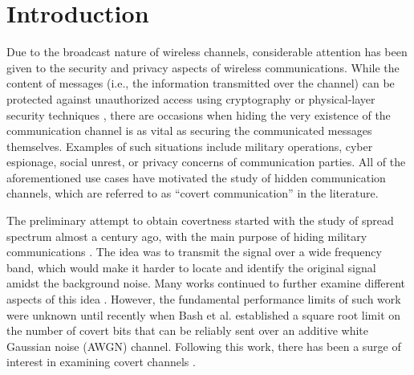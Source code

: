 \section{Introduction}
\label{s:intro}
Due to the broadcast nature of wireless channels, considerable attention has been given to the security and privacy aspects of wireless communications. While the content of messages (i.e., the information transmitted over the channel) can be protected against unauthorized access using cryptography or physical-layer security techniques \cite{zhou2013physical}, there are occasions when hiding the very existence of the communication channel is as vital as securing the communicated messages themselves. Examples of such situations include military operations, cyber espionage, social unrest, or privacy concerns of communication parties. All of the aforementioned use cases have motivated the study of hidden communication channels, which are referred to as ``covert communication'' \cite{lampson1973note, bloch2016covert} in the literature.

The preliminary attempt to obtain covertness started with the study of spread spectrum almost a century ago, with the main purpose of hiding military communications \cite{scholtz1982origins}. The idea was to transmit the signal over a wide frequency band, which would make it harder to locate and identify the original signal amidst the background noise. Many works continued to further examine different aspects of this idea \cite{reynders2016chirp, yan2019low}. However, the fundamental performance limits of such work were unknown until recently when Bash et al. \cite{bash2012square, bash2013limits} established a square root limit on the number of covert bits that can be reliably sent over an additive white Gaussian noise (AWGN) channel. Following this work, there has been a surge of interest in examining covert channels \cite{sobers2017covert,soltani2018covert,sheikholeslami2018multi,cao2018wireless}.

